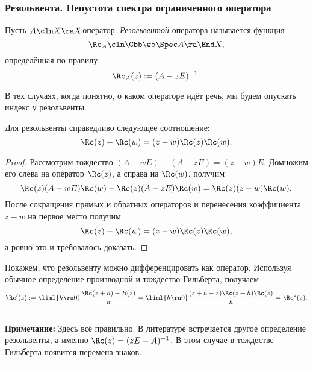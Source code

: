 \documentclass[a4paper]{article}
\newcommand{\comment}[1]{\par\vskip2pt\hrule\vskip2pt{\footnotesize \textbf{Примечание:} #1\par}\vskip2pt\hrule\vskip2pt}
\begin{document}
\subsubsection{Резольвента. Непустота спектра ограниченного оператора}

\begin{df}
Пусть $A\cln X \ra X$\т оператор. \emph{Резольвентой} оператора называется функция
$$\Rc_A \cln \Cbb \wo \Spec A \ra \End X,$$
определённая по правилу
$$\Rc_A(z) := (A - z E)^{-1}.$$
\end{df}

\begin{note}
В тех случаях, когда понятно, о каком операторе идёт речь, мы будем опускать индекс у резольвенты.
\end{note}

\begin{lemma}
\label{lemma:hilbert.equality}
Для резольвенты справедливо следующее соотношение:
$$\Rc(z) - \Rc(w) = (z-w)\Rc(z)\Rc(w).$$
\end{lemma}
\begin{proof}
Рассмотрим тождество $(A - wE) - (A - z E) = (z-w)E$. Домножим его слева на оператор $\Rc(z)$, а справа на $\Rc(w)$,
получим
$$\Rc(z)(A - wE)\Rc(w) - \Rc(z)(A - zE)\Rc(w) = \Rc(z)(z-w)\Rc(w).$$
После сокращения прямых и обратных операторов и перенесения коэффициента $z-w$ на первое место получим
$$\Rc(z) - \Rc(w) = (z-w)\Rc(z)\Rc(w),$$
а ровно это и требовалось доказать.
\end{proof}

Покажем, что резольвенту можно дифференцировать как оператор.
Используя обычное определение производной и тождество Гильберта, получаем
$$\Rc'(z) := \liml{h \ra 0}\frac{\Rc(z+h) - R(z)}{h} = \liml{h\ra 0} \frac{(z+h-z)\Rc(z+h)\Rc(z)}{h} = \Rc^2(z).$$

\comment{Здесь всё правильно. В литературе встречается другое определение резольвенты,
а именно $\Rc(z) = (zE-A)^{-1}$. В этом случае в тождестве Гильберта появится перемена знаков.}
\end{document}
